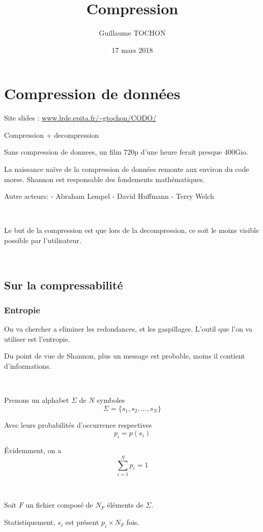 \documentclass[a4paper,11pt]{article}
\title{Compression}
\author{Guillaume TOCHON}
\date{17 mars 2018}
\begin{document}
\maketitle
\tableofcontents

\section{Compression de données}

Site slides : \url{www.lrde.epita.fr/~gtochon/CODO/}

Compression + decompression

Sans compression de donnees, un film 720p d'une heure ferait presque 400Gio.

La naissance naïve de la compression de données remonte aux environ du code
morse.
Shannon est responsable des fondements mathématiques.

Autre acteurs:
  - Abraham Lempel
  - David Huffmann
  - Terry Welch

\

Le but de la compression est que lors de la decompression, ce soit le moins
visible possible par l'utilisateur.

\

\subsection{Sur la compressabilité}

\subsubsection{Entropie}

On va chercher a eliminer les redondances, et les gaspillages.
L'outil que l'on va utiliser est l'entropie.

Du point de vue de Shannon, plus un message est probable, moins il contient
d'informations.

\

Prenons un alphabet $\Sigma$ de $N$ symboles
$$ \Sigma = \{s_1,s_2, ..., s_N\} $$

Avec leurs probabilités d'occurrence respectives
$$ p_i = p(s_i) $$

Évidemment, on a
$$ \sum_{i = 1}^{N} p_i = 1$$

\

Soit $F$ un fichier composé de $N_F$ éléments de $ \Sigma $.

Statistiquement, $s_i$ est présent $p_i \times N_F$ fois.
\end{document}
